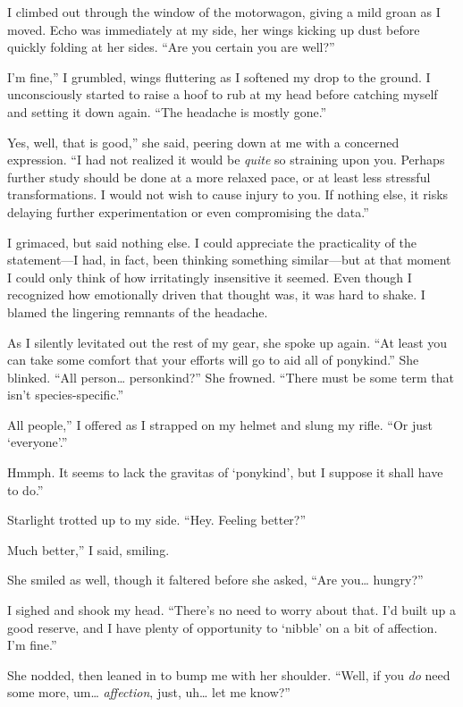 {\br}%
I climbed out through the window of the motorwagon, giving a mild groan as I moved. Echo was immediately at my side, her wings kicking up dust before quickly folding at her sides. “Are you certain you are well?”

\leavevmode{}I’m fine,” I grumbled, wings fluttering as I softened my drop to the ground. I unconsciously started to raise a hoof to rub at my head before catching myself and setting it down again. “The headache is mostly gone.”

\leavevmode{}Yes, well, that is good,” she said, peering down at me with a concerned expression. “I had not realized it would be \textit{quite} so straining upon you. Perhaps further study should be done at a more relaxed pace, or at least less stressful transformations. I would not wish to cause injury to you. If nothing else, it risks delaying further experimentation or even compromising the data.”

I grimaced, but said nothing else. I could appreciate the practicality of the statement—I had, in fact, been thinking something similar—but at that moment I could only think of how irritatingly insensitive it seemed. Even though I recognized how emotionally driven that thought was, it was hard to shake. I blamed the lingering remnants of the headache.

As I silently levitated out the rest of my gear, she spoke up again. “At least you can take some comfort that your efforts will go to aid all of ponykind.” She blinked. “All person… personkind?” She frowned. “There must be some term that isn’t species-specific.”

\leavevmode{}All people,” I offered as I strapped on my helmet and slung my rifle. “Or just ‘everyone’.”

\leavevmode{}Hmmph. It seems to lack the gravitas of ‘ponykind’, but I suppose it shall have to do.”

Starlight trotted up to my side. “Hey. Feeling better?”

\leavevmode{}Much better,” I said, smiling.

She smiled as well, though it faltered before she asked, “Are you… hungry?”

I sighed and shook my head. “There’s no need to worry about that. I’d built up a good reserve, and I have plenty of opportunity to ‘nibble’ on a bit of affection. I’m fine.”

She nodded, then leaned in to bump me with her shoulder. “Well, if you \textit{do} need some more, um… \textit{affection}, just, uh… let me know?”

